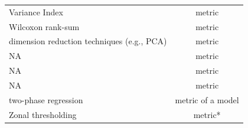 \documentclass[12pt,twoside,openany]{reedthesis}
\begin{document}
\begin{longtable}[]{@{}lc@{}}
\begin{minipage}[t]{0.31\columnwidth}
Variance Index\strut
\end{minipage} & \begin{minipage}[t]{0.35\columnwidth}\centering
metric\strut
\end{minipage}\tabularnewline
\begin{minipage}[t]{0.31\columnwidth}\raggedright
Wilcoxon
rank-sum\strut
\end{minipage} & \begin{minipage}[t]{0.35\columnwidth}\centering
metric\strut
\end{minipage}\tabularnewline
\begin{minipage}[t]{0.31\columnwidth}\raggedright
dimension
reduction
techniques
(e.g., PCA)\strut
\end{minipage} & \begin{minipage}[t]{0.35\columnwidth}\centering
metric\strut
\end{minipage}\tabularnewline
\begin{minipage}[t]{0.31\columnwidth}\raggedright
NA\strut
\end{minipage} & \begin{minipage}[t]{0.35\columnwidth}\centering
metric\strut
\end{minipage}\tabularnewline
\begin{minipage}[t]{0.31\columnwidth}\raggedright
NA\strut
\end{minipage} & \begin{minipage}[t]{0.35\columnwidth}\centering
metric\strut
\end{minipage}\tabularnewline
\begin{minipage}[t]{0.31\columnwidth}\raggedright
NA\strut
\end{minipage} & \begin{minipage}[t]{0.35\columnwidth}\centering
metric\strut
\end{minipage}\tabularnewline
\begin{minipage}[t]{0.31\columnwidth}\raggedright
two-phase
regression\strut
\end{minipage} & \begin{minipage}[t]{0.35\columnwidth}\centering
metric of a model\strut
\end{minipage}\tabularnewline
\begin{minipage}[t]{0.31\columnwidth}\raggedright
Zonal
thresholding\strut
\end{minipage} & \begin{minipage}[t]{0.35\columnwidth}\centering
metric*\strut
\end{minipage}\tabularnewline

\end{longtable}
\end{document}
